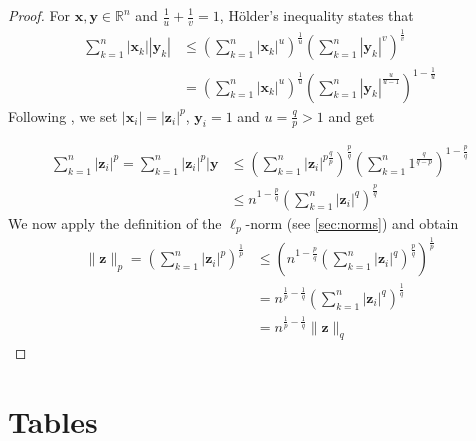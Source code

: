 \begin{proof}
    For $\mathbf{x}, \mathbf{y} \in \mathbb{R}^n$ and $\frac{1}{u} + \frac{1}{v} = 1$, Hölder's inequality states that
    \begin{align*}
        \sum_{k=1}^n |\mathbf{x}_k| |\mathbf{y}_k| & \leq \left(\sum_{k=1}^n |\mathbf{x}_k|^u\right)^{\frac{1}{u}} \left(\sum_{k=1}^n |\mathbf{y}_k|^v\right)^{\frac{1}{v}}              \\
                                                   & = \left(\sum_{k=1}^n |\mathbf{x}_k|^u\right)^{\frac{1}{u}} \left(\sum_{k=1}^n |\mathbf{y}_k|^{\frac{u}{u-1}}\right)^{1-\frac{1}{u}}
    \end{align*}
    Following \cite{norm-relations}, we set $|\mathbf{x}_i| = |\mathbf{z}_i|^p$, $\mathbf{y}_i = 1$ and $u = \frac{q}{p} > 1$ and get

    \begin{align*}
        \sum_{k=1}^n |\mathbf{z}_i|^p  = \sum_{k=1}^n |\mathbf{z}_i|^p |\mathbf{y} & \leq \left(\sum_{k=1}^n |\mathbf{z}_i|^{p \frac{q}{p}}\right)^{\frac{p}{q}} \left(\sum_{k=1}^n 1^\frac{q}{q-p}\right)^{1-\frac{p}{q}} \\
                                                                                   & \leq n^{1-\frac{p}{q}} \left(\sum_{k=1}^n  |\mathbf{z}_i|^q\right)^{\frac{p}{q}}
    \end{align*}
    We now apply the definition of the $\ell_p$-norm (see \cref{sec:norms}) and obtain
    \begin{align*}
        \|\mathbf{z}\|_p = \left(\sum_{k=1}^n |\mathbf{z}_i|^p\right)^{\frac{1}{p}} & \leq  \left(n^{1-\frac{p}{q}} \left(\sum_{k=1}^n  |\mathbf{z}_i|^q \right)^{\frac{p}{q}} \right)^{\frac{1}{p}} \\
                                                                                    & = n^{\frac{1}{p}-\frac{1}{q}}\left(\sum_{k=1}^n |\mathbf{z}_i|^q\right)^{\frac{1}{q}}                          \\
                                                                                    & = n^{\frac{1}{p}-\frac{1}{q}} \|\mathbf{z}\|_q
    \end{align*}
\end{proof}

\chapter{Tables}
